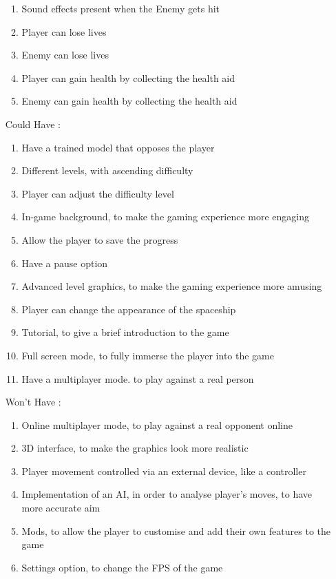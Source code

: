 \documentclass[12pt]{article}
\begin{document}
\begin{itemize}
\begin{enumerate}
        \item Sound effects present when the Enemy gets hit
        \item Player can lose lives 
        \item Enemy can lose lives
        \item Player can gain health by collecting the health aid
        \item Enemy can gain health by collecting the health aid
    \end{enumerate}
    \item[Could Have]:
    \begin{enumerate}
        \item Have a trained model that opposes the player
        \item Different levels, with ascending difficulty
        \item Player can adjust the difficulty level
        \item In-game background, to make the gaming experience more engaging
        \item Allow the player to save the progress
        \item Have a pause option
        \item Advanced level graphics, to make the gaming experience more amusing
        \item Player can change the appearance of the spaceship
        \item Tutorial, to give a brief introduction to the game
        \item Full screen mode, to fully immerse the player into the game
        \item Have a multiplayer mode. to play against a real person
    \end{enumerate}
    \item[Won't Have]:
    \begin{enumerate}
        \item Online multiplayer mode, to play against a real opponent online
        \item 3D interface, to make the graphics look more realistic
        \item Player movement controlled via an external device, like a controller
        \item Implementation of an AI, in order to analyse player's moves, to have more accurate aim
        \item Mods, to allow the player to customise and add their own features to the game
        \item Settings option, to change the FPS of the game
    \end{enumerate}
\end{itemize}
\end{document}
